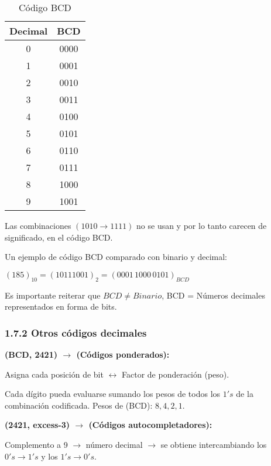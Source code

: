 \begin{table}[h]
    \centering
    \begin{tabular}{cc}
        \toprule
        Decimal & BCD  \\
        \midrule
        0       & 0000 \\
        1       & 0001 \\
        2       & 0010 \\
        3       & 0011 \\
        4       & 0100 \\
        5       & 0101 \\
        6       & 0110 \\
        7       & 0111 \\
        8       & 1000 \\
        9       & 1001 \\
        \bottomrule
    \end{tabular}
    \caption{C\'{o}digo BCD}
    \label{tab:code_bcd}
\end{table}

Las combinaciones $(1010 \rightarrow 1111)$ no se usan y por lo tanto carecen
de significado, en el c\'{o}digo BCD.

Un ejemplo de c\'{o}digo BCD comparado con binario y decimal:
\begin{center}
    $(185)_{10} = (10111001)_{2} = (0001\,1000\,0101)_{BCD}$
\end{center}

Es importante reiterar que $BCD \neq Binario$, BCD = N\'{u}meros decimales
representados en forma de bits.

\subsubsection*{1.7.2 Otros c\'{o}digos decimales}
\textbf{(BCD, 2421) $\rightarrow$ (C\'{o}digos ponderados):}
\medbreak

Asigna cada posici\'{o}n de bit $\leftrightarrow$ Factor de ponderaci\'{on} (peso).

Cada d\'{i}gito pueda evaluarse sumando los pesos de todos los $1's$ de la
combinaci\'{o}n codificada. Pesos de (BCD): $8, 4, 2, 1$.
\medbreak

\textbf{(2421, excess-3) $\rightarrow$ (C\'{o}digos autocompletadores):}

Complemento a 9 $\rightarrow$ n\'{u}mero decimal $\rightarrow$ se obtiene
intercambiando los $0's \rightarrow 1's$ y los $1's \rightarrow 0's$.
\medbreak

